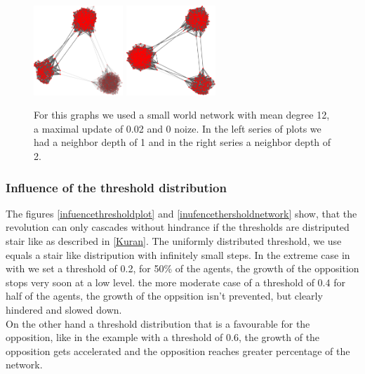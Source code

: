 \begin{figure}
\includegraphics[width=0.3\textwidth]{batchRun__kHalf=6-6-6_maxUpdate=0.02_noize=0_nbrDepth=1/network1000-crop.pdf}
\hskip2cm
\includegraphics[width=0.3\textwidth]{batchRun__kHalf=6-6-6_maxUpdate=0.02_noize=0_nbrDepth=2/network1000-crop.pdf}

\caption{For this graphs we used a small world network with mean degree 12, a maximal update of 0.02 and 0 noize. In the left series of plots we had a neighbor depth of 1 and in the right series a neighbor depth of 2.}
\label{influencenbrdepth}
\end{figure}

\subsubsection{Influence of the threshold distribution}
\label{sec:influencethresholddistribution}

The figures \ref{infuencethresholdplot} and \ref{inufencethersholdnetwork} show, that the revolution can only cascades without hindrance if the thresholds are distriputed stair like as described in \ref{Kuran}. The uniformly distributed threshold, we use equals a stair like distripution with infinitely small steps. In the extreme case in with we set a threshold of 0.2, for 50\% of the agents, the growth of the opposition stops very soon at a low level. the more moderate case of a threshold of 0.4 for half of the agents, the growth of the oppsition isn't prevented, but clearly hindered and slowed down.\\
On the other hand a threshold distribution that is a favourable for the opposition, like in the example with a threshold of 0.6, the growth of the opposition gets accelerated and the opposition reaches greater percentage of the network.  


